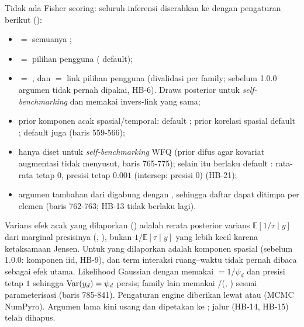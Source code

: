 Tidak ada Fisher scoring: seluruh inferensi diserahkan ke
 dengan pengaturan berikut ():
\begin{itemize}
  \item {} $=$ 
        semuanya ;
  \item {} $=$  pilihan pengguna
        ( default);
  \item {} $=$ , dan
         $=$ link pilihan
        pengguna (divalidasi per family; sebelum 1.0.0 argumen 
        tidak pernah dipakai, HB-6). Draws posterior untuk
        \emph{self-benchmarking} dan  memakai invers-link
        yang sama;
  \item prior komponen acak spasial/temporal:  default
        ; prior korelasi spasial 
        default ;  default juga
         (baris 559-566);
  \item {} hanya diset untuk \emph{self-benchmarking} WFQ
        (prior difus agar kovariat augmentasi tidak menyusut, baris
        765-775); selain itu berlaku default : rata-rata tetap
        $0$, presisi tetap $0.001$ (intersep: presisi $0$) (HB-21);
  \item argumen  tambahan dari
         digabung dengan , sehingga
        daftar  dapat ditimpa per elemen (baris 762-763;
        HB-13 tidak berlaku lagi).
\end{itemize}
Varians efek acak yang dilaporkan () adalah rerata
posterior varians $\mathbb E[1/\tau\mid y]$ dari marginal presisinya
(, ), bukan
$1/\mathbb E[\tau\mid y]$ yang lebih kecil karena ketaksamaan Jensen.
Untuk  yang dilaporkan adalah komponen spasial
(sebelum 1.0.0: komponen iid, HB-9), dan term interaksi ruang--waktu tidak
pernah dibaca sebagai efek utama.
Likelihood Gaussian dengan  memakai  $=1/\psi_d$
dan presisi tetap $1$ sehingga $\operatorname{Var}(y_d)=\psi_d$ persis; family lain
memakai /(, ) sesuai parameterisasi
 (baris 785-841). Pengaturan engine diberikan lewat
 atau
 (MCMC NumPyro). Argumen lama
 kini usang dan dipetakan ke
; jalur 
(HB-14, HB-15) telah dihapus.

